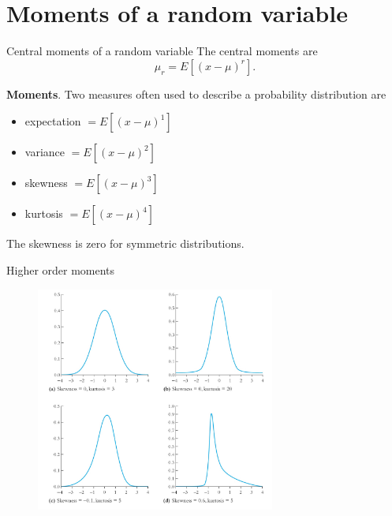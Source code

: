 \documentclass[11pt,table]{beamer}
\begin{document}
\section{Moments of a random variable}

\begin{frame}{Central moments of a random variable}
The central moments are
 \begin{equation*}
    \mu_{r} = E[(x - \mu)^{r}].
 \end{equation*}
\small
\begin{example} \textbf{Moments}. 
Two measures often used to describe a probability distribution are
\begin{itemize}
	\item expectation $= E[(x - \mu)^{1}]$
	\item variance $= E[(x - \mu)^{2}]$
	\item skewness $= E[(x - \mu)^{3}]$
	\item kurtosis $= E[(x - \mu)^{4}]$
\end{itemize}
The skewness is zero for symmetric distributions.
\end{example}

\end{frame}

\begin{frame}{Higher order moments}
\begin{figure}[H]
\begin{center}
{\includegraphics[width=0.7\textwidth]{figures/skewness_kurtosis}}\label{skewness_kurtosis}
\end{center}
\end{figure}
\end{frame}
\end{document}
